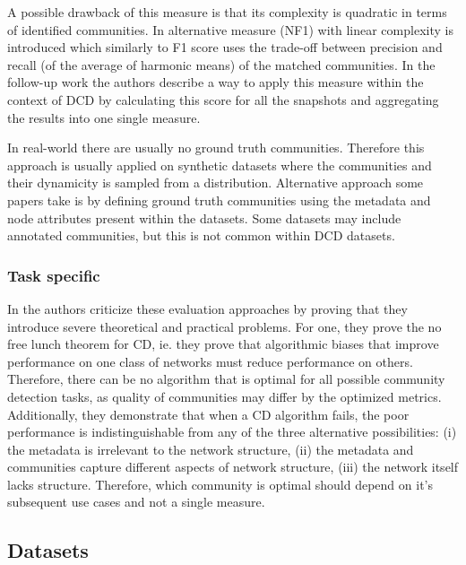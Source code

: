 \documentclass[
acmsmall,
nonacm,
screen,
acmthm]{../../scripts/pandoc/templates/acmart}
\begin{document}
A possible drawback of this measure is that its complexity is quadratic
in terms of identified communities. In
\citep{rossettiNovelApproachEvaluate2016} alternative measure (NF1) with
linear complexity is introduced which similarly to F1 score uses the
trade-off between precision and recall (of the average of harmonic
means) of the matched communities. In the follow-up work
\citep{rossettiANGELEfficientEffective2020} the authors describe a way
to apply this measure within the context of DCD by calculating this
score for all the snapshots and aggregating the results into one single
measure.

In real-world there are usually no ground truth communities. Therefore
this approach is usually applied on synthetic datasets where the
communities and their dynamicity is sampled from a distribution.
Alternative approach some papers take is by defining ground truth
communities using the metadata and node attributes present within the
datasets. Some datasets may include annotated communities, but this is
not common within DCD datasets.

\hypertarget{task-specific}{%
\subsubsection{Task specific}\label{task-specific}}

In \citep{peelGroundTruthMetadata2017} the authors criticize these
evaluation approaches by proving that they introduce severe theoretical
and practical problems. For one, they prove the no free lunch theorem
for CD, ie. they prove that algorithmic biases that improve performance
on one class of networks must reduce performance on others. Therefore,
there can be no algorithm that is optimal for all possible community
detection tasks, as quality of communities may differ by the optimized
metrics. Additionally, they demonstrate that when a CD algorithm fails,
the poor performance is indistinguishable from any of the three
alternative possibilities: (i) the metadata is irrelevant to the network
structure, (ii) the metadata and communities capture different aspects
of network structure, (iii) the network itself lacks structure.
Therefore, which community is optimal should depend on it's subsequent
use cases and not a single measure.

\hypertarget{datasets}{%
\subsection{Datasets}\label{datasets}}
\end{document}
